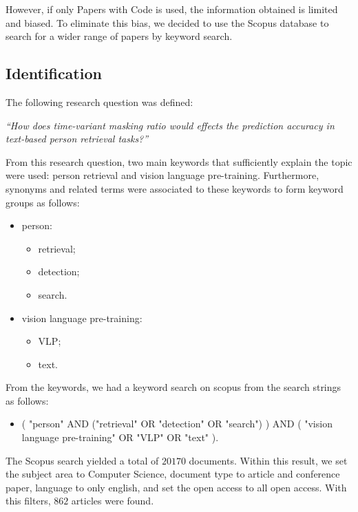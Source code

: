However, if only Papers with Code is used, the information obtained is limited and biased. To eliminate this bias, we decided to use the Scopus database to search for a wider range of papers by keyword search.

\subsection*{Identification}

The following research question was defined:

\bigskip
\textit{``How does time-variant masking ratio would effects the prediction accuracy in text-based person retrieval tasks?''}
\bigskip

From this research question, two main keywords that sufficiently explain the topic were used: person retrieval and vision language pre-training.
Furthermore, synonyms and related terms were associated to these keywords to form keyword groups as follows:

\begin{itemize}
    \item person:
    \begin{itemize}
        \item retrieval;
        \item detection;
        \item search.
    \end{itemize}
    \item vision language pre-training:
    \begin{itemize}
        \item VLP;
        \item text.
    \end{itemize}
\end{itemize}


From the keywords, we had a keyword search on scopus from the search strings as follows:

\begin{itemize}
    \item ( "person" AND ("retrieval" OR "detection" OR "search") ) AND ( "vision language pre-training" OR "VLP" OR "text" ).
\end{itemize}

The Scopus search yielded a total of $20170$ documents. Within this result, we set the subject area to Computer Science, document type to article and conference paper, language to only english, and set the open access to all open access. With this filters, $862$ articles were found. 

